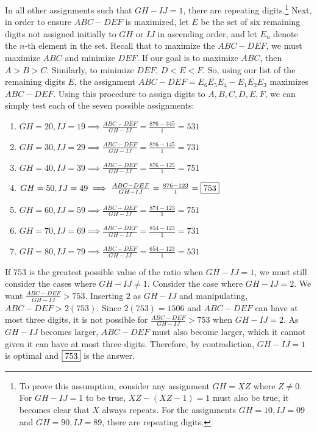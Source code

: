 \documentclass[10pt]{article}
\theoremstyle{plain}
\theoremstyle{definition}
\theoremstyle{remark}
\begin{document}
In all other assignments such that \(GH-IJ=1\), there are repeating digits.\footnote{To prove this assumption,  consider any assignment \(GH = XZ\) where \(Z \neq 0\). For \(GH-IJ=1\) to be true, \(XZ-(XZ-1)=1\) must also be true, it becomes clear that \(X\) always repeats. For the assignments \(GH=10, IJ=09\) and \(GH=90, IJ=89\), there are repeating digits.} Next, in order to ensure \(ABC-DEF\) is maximized, let \(E\) be the set of six remaining digits not assigned initially to \(GH\) or \(IJ\) in ascending order, and let \(E_n\) denote the \(n\)-th element in the set. Recall that to maximize the \(ABC-DEF\), we must maximize \(ABC\) and minimize \(DEF\). If our goal is to maximize \(ABC\), then \(A>B>C\). Similarly, to minimize \(DEF\), \(D<E<F\). So, using our list of the remaining digits \(E\), the assignment \(ABC - DEF = \overline{E_6E_5E_4} - \overline{E_1E_2E_3}\) maximizes \(ABC - DEF\). Using this procedure to assign digits to \(A,B,C,D,E,F\), we can simply test each of the seven possible assignments:\

\begin{enumerate}
\item \(GH=20, IJ=19 \implies \frac{ABC-DEF}{GH-IJ}=\frac{876-345}{1}=531\) 
\item \(GH=30, IJ=29 \implies \frac{ABC-DEF}{GH-IJ}=\frac{876-145}{1}=731\) 
\item \(GH=40, IJ=39 \implies \frac{ABC-DEF}{GH-IJ}=\frac{876-125}{1}=751\) 
\item \(GH=50, IJ=49 \implies \frac{ABC-DEF}{GH-IJ}=\frac{876-123}{1}=\fbox{753}\) 
\item \(GH=60, IJ=59 \implies \frac{ABC-DEF}{GH-IJ}=\frac{874-123}{1}=751\) 
\item \(GH=70, IJ=69 \implies \frac{ABC-DEF}{GH-IJ}=\frac{854-123}{1}=731\) 
\item \(GH=80, IJ=79 \implies \frac{ABC-DEF}{GH-IJ}=\frac{654-123}{1}=531\)	
\end{enumerate}

If \(753\) is the greatest possible value of the ratio when \(GH-IJ=1\), we must still consider the cases where \(GH-IJ \neq 1\). Consider the case where \(GH-IJ=2\). We want \(\frac{ABC-DEF}{GH-IJ}>753\). Inserting \(2\) as \(GH-IJ\) and manipulating, \(ABC-DEF>2(753)\). Since \(2(753)=1506\) and \(ABC-DEF\) can have at most three digits, it is not possible for \(\frac{ABC-DEF}{GH-IJ}>753\) when \(GH-IJ=2\). As \(GH-IJ\) becomes larger, \(ABC-DEF\) must also become larger, which it cannot given it can have at most three digits. Therefore, by contradiction, \(GH-IJ=1\) is optimal and \(\fbox{753}\) is the answer. 
\end{document}
